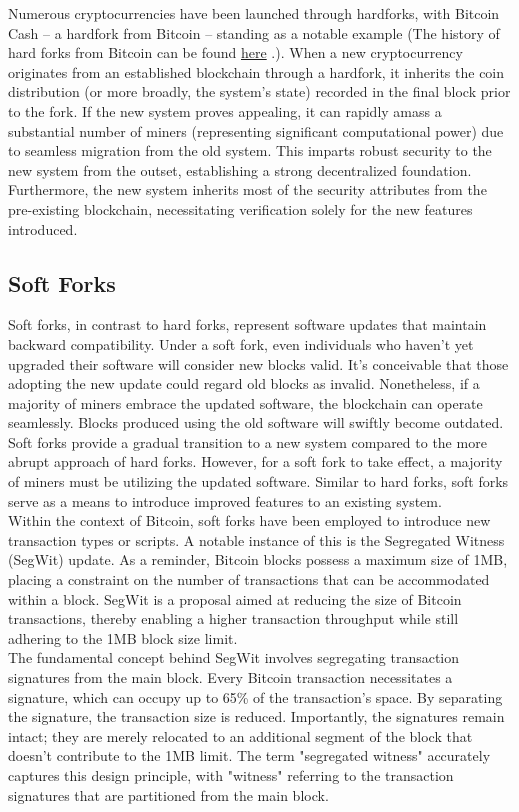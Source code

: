 Numerous cryptocurrencies have been launched through hardforks, with Bitcoin Cash – a hardfork from Bitcoin – standing as a notable example (The history of hard forks from Bitcoin can be found \href{https://www.investopedia.com/tech/history-bitcoin-hard-forks/}{here} .). When a new cryptocurrency originates from an established blockchain through a hardfork, it inherits the coin distribution (or more broadly, the system's state) recorded in the final block prior to the fork. If the new system proves appealing, it can rapidly amass a substantial number of miners (representing significant computational power) due to seamless migration from the old system. This imparts robust security to the new system from the outset, establishing a strong decentralized foundation. Furthermore, the new system inherits most of the security attributes from the pre-existing blockchain, necessitating verification solely for the new features introduced.
\subsection{Soft Forks}
Soft forks, in contrast to hard forks, represent software updates that maintain backward compatibility. Under a soft fork, even individuals who haven't yet upgraded their software will consider new blocks valid. It's conceivable that those adopting the new update could regard old blocks as invalid. Nonetheless, if a majority of miners embrace the updated software, the blockchain can operate seamlessly. Blocks produced using the old software will swiftly become outdated. Soft forks provide a gradual transition to a new system compared to the more abrupt approach of hard forks. However, for a soft fork to take effect, a majority of miners must be utilizing the updated software. Similar to hard forks, soft forks serve as a means to introduce improved features to an existing system.\\
Within the context of Bitcoin, soft forks have been employed to introduce new transaction types or scripts. A notable instance of this is the Segregated Witness (SegWit) update. As a reminder, Bitcoin blocks possess a maximum size of 1MB, placing a constraint on the number of transactions that can be accommodated within a block. SegWit is a proposal aimed at reducing the size of Bitcoin transactions, thereby enabling a higher transaction throughput while still adhering to the 1MB block size limit.\\
The fundamental concept behind SegWit involves segregating transaction signatures from the main block. Every Bitcoin transaction necessitates a signature, which can occupy up to 65\% of the transaction's space. By separating the signature, the transaction size is reduced. Importantly, the signatures remain intact; they are merely relocated to an additional segment of the block that doesn't contribute to the 1MB limit. The term "segregated witness" accurately captures this design principle, with "witness" referring to the transaction signatures that are partitioned from the main block.

